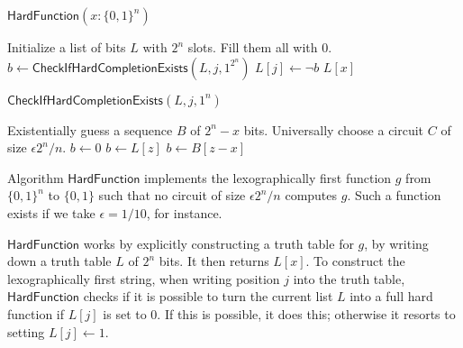 \documentclass{article}
\begin{document}





\begin{algorithm}{$\mathsf{HardFunction}(x : \{0, 1\}^n)$}
\begin{algorithmic}[1]
	\STATE {}
	\STATE Initialize a list of bits $L$ with $2^n$ slots.  Fill them all with 0.
	\STATE {}
	\STATE {}
	\STATE $b \gets \mathsf{CheckIfHardCompletionExists}(L, j, 1^{2^n})$
	\STATE $L[j] \gets \neg b$
	\ENDFOR
	\RETURN $L[x]$
\end{algorithmic}
\end{algorithm}

\begin{algorithm}{$\mathsf{CheckIfHardCompletionExists}(L, j, 1^n)$}
	\begin{algorithmic}[1]
		\STATE {}
		\STATE Existentially guess a sequence $B$ of $2^n - x$ bits.
		\STATE Universally choose a circuit $C$ of size $\epsilon 2^n/n$.
			\STATE {}
				\STATE $b \gets 0$
				\STATE $b \gets L[z]$
			\ELSE
				\STATE $b \gets B[z - x]$
			\ENDIF

			\STATE {}
			\ENDIF
		\ENDFOR
	\end{algorithmic}
\end{algorithm}


Algorithm $\mathsf{HardFunction}$ implements the lexographically first function $g$ from $\{0, 1\}^n$ to $\{0, 1\}$ such that no circuit of size $\epsilon 2^n/n$ computes $g$.
Such a function exists if we take $\epsilon = 1/10$, for instance.

$\mathsf{HardFunction}$ works by explicitly constructing a truth table for $g$, by writing down a truth table $L$ of $2^n$ bits.  It then returns $L[x]$.
To construct the lexographically first string, when writing position $j$ into the truth table, $\mathsf{HardFunction}$ checks if it is possible to turn the current list $L$ into a full hard function if $L[j]$ is set to 0.  If this is possible, it does this; otherwise it resorts to setting $L[j] \gets 1$.
\end{document}
